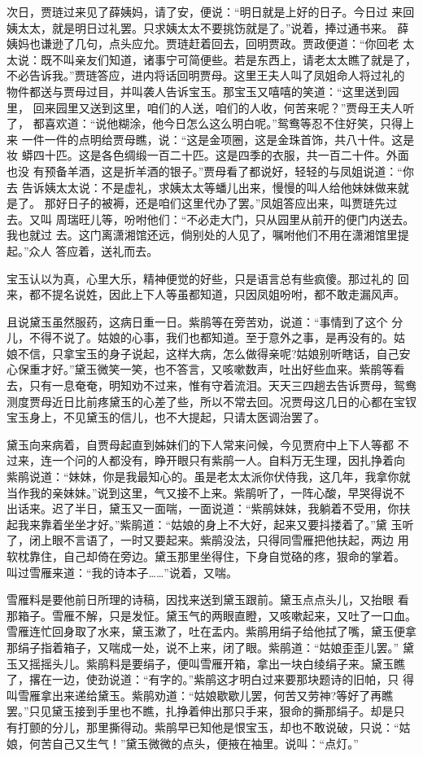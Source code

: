 次日，贾琏过来见了薛姨妈，请了安，便说：“明日就是上好的日子。今日过
来回姨太太，就是明日过礼罢。只求姨太太不要挑饬就是了。”说着，捧过通书来。
薛姨妈也谦逊了几句，点头应允。贾琏赶着回去，回明贾政。贾政便道：“你回老
太太说：既不叫亲友们知道，诸事宁可简便些。若是东西上，请老太太瞧了就是了，
不必告诉我。”贾琏答应，进内将话回明贾母。这里王夫人叫了凤姐命人将过礼的
物件都送与贾母过目，并叫袭人告诉宝玉。那宝玉又嘻嘻的笑道：“这里送到园里，
回来园里又送到这里，咱们的人送，咱们的人收，何苦来呢？”贾母王夫人听了，
都喜欢道：“说他糊涂，他今日怎么这么明白呢。”鸳鸯等忍不住好笑，只得上来
一件一件的点明给贾母瞧，说：“这是金项圈，这是金珠首饰，共八十件。这是妆
蟒四十匹。这是各色绸缎一百二十匹。这是四季的衣服，共一百二十件。外面也没
有预备羊酒，这是折羊酒的银子。”贾母看了都说好，轻轻的与凤姐说道：“你去
告诉姨太太说：不是虚礼，求姨太太等蟠儿出来，慢慢的叫人给他妹妹做来就是了。
那好日子的被褥，还是咱们这里代办了罢。”凤姐答应出来，叫贾琏先过去。又叫
周瑞旺儿等，吩咐他们：“不必走大门，只从园里从前开的便门内送去。我也就过
去。这门离潇湘馆还远，倘别处的人见了，嘱咐他们不用在潇湘馆里提起。”众人
答应着，送礼而去。

宝玉认以为真，心里大乐，精神便觉的好些，只是语言总有些疯傻。那过礼的
回来，都不提名说姓，因此上下人等虽都知道，只因凤姐吩咐，都不敢走漏风声。

且说黛玉虽然服药，这病日重一日。紫鹃等在旁苦劝，说道：“事情到了这个
分儿，不得不说了。姑娘的心事，我们也都知道。至于意外之事，是再没有的。姑
娘不信，只拿宝玉的身子说起，这样大病，怎么做得亲呢?姑娘别听瞎话，自己安
心保重才好。”黛玉微笑一笑，也不答言，又咳嗽数声，吐出好些血来。紫鹃等看
去，只有一息奄奄，明知劝不过来，惟有守着流泪。天天三四趟去告诉贾母，鸳鸯
测度贾母近日比前疼黛玉的心差了些，所以不常去回。况贾母这几日的心都在宝钗
宝玉身上，不见黛玉的信儿，也不大提起，只请太医调治罢了。

黛玉向来病着，自贾母起直到姊妹们的下人常来问候，今见贾府中上下人等都
不过来，连一个问的人都没有，睁开眼只有紫鹃一人。自料万无生理，因扎挣着向
紫鹃说道：“妹妹，你是我最知心的。虽是老太太派你伏侍我，这几年，我拿你就
当作我的亲妹妹。”说到这里，气又接不上来。紫鹃听了，一阵心酸，早哭得说不
出话来。迟了半日，黛玉又一面喘，一面说道：“紫鹃妹妹，我躺着不受用，你扶
起我来靠着坐坐才好。”紫鹃道：“姑娘的身上不大好，起来又要抖搂着了。”黛
玉听了，闭上眼不言语了，一时又要起来。紫鹃没法，只得同雪雁把他扶起，两边
用软枕靠住，自己却倚在旁边。黛玉那里坐得住，下身自觉硌的疼，狠命的掌着。
叫过雪雁来道：“我的诗本子……”说着，又喘。

雪雁料是要他前日所理的诗稿，因找来送到黛玉跟前。黛玉点点头儿，又抬眼
看那箱子。雪雁不解，只是发怔。黛玉气的两眼直瞪，又咳嗽起来，又吐了一口血。
雪雁连忙回身取了水来，黛玉漱了，吐在盂内。紫鹃用绢子给他拭了嘴，黛玉便拿
那绢子指着箱子，又喘成一处，说不上来，闭了眼。紫鹃道：“姑娘歪歪儿罢。”
黛玉又摇摇头儿。紫鹃料是要绢子，便叫雪雁开箱，拿出一块白绫绢子来。黛玉瞧
了，撂在一边，使劲说道：“有字的。”紫鹃这才明白过来要那块题诗的旧帕，只
得叫雪雁拿出来递给黛玉。紫鹃劝道：“姑娘歇歇儿罢，何苦又劳神?等好了再瞧
罢。”只见黛玉接到手里也不瞧，扎挣着伸出那只手来，狠命的撕那绢子。却是只
有打颤的分儿，那里撕得动。紫鹃早已知他是恨宝玉，却也不敢说破，只说：“姑
娘，何苦自己又生气！”黛玉微微的点头，便掖在袖里。说叫：“点灯。”

